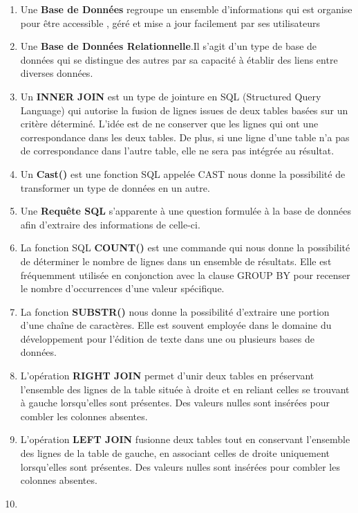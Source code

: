 \documentclass[
]{article}
\begin{document}
\begin{enumerate}
\def\labelenumi{\arabic{enumi}.}
\item
  Une \textbf{Base de Données} regroupe un ensemble d'informations qui
  est organise pour être accessible , géré et mise a jour facilement par
  ses utilisateurs
\item
  Une \textbf{Base de Données Relationnelle}.Il s'agit d'un type de base
  de données qui se distingue des autres par sa capacité à établir des
  liens entre diverses données.
\item
  Un \textbf{INNER JOIN} est un type de jointure en SQL (Structured
  Query Language) qui autorise la fusion de lignes issues de deux tables
  basées sur un critère déterminé. L'idée est de ne conserver que les
  lignes qui ont une correspondance dans les deux tables. De plus, si
  une ligne d'une table n'a pas de correspondance dans l'autre table,
  elle ne sera pas intégrée au résultat.
\item
  Un \textbf{Cast()} est une fonction SQL appelée CAST nous donne la
  possibilité de transformer un type de données en un autre.
\item
  Une \textbf{Requête SQL} s'apparente à une question formulée à la base
  de données afin d'extraire des informations de celle-ci.
\item
  La fonction SQL \textbf{COUNT()} est une commande qui nous donne la
  possibilité de déterminer le nombre de lignes dans un ensemble de
  résultats. Elle est fréquemment utilisée en conjonction avec la clause
  GROUP BY pour recenser le nombre d'occurrences d'une valeur
  spécifique.
\item
  La fonction \textbf{SUBSTR()} nous donne la possibilité d'extraire une
  portion d'une chaîne de caractères. Elle est souvent employée dans le
  domaine du développement pour l'édition de texte dans une ou plusieurs
  bases de données.
\item
  L'opération \textbf{RIGHT JOIN} permet d'unir deux tables en
  préservant l'ensemble des lignes de la table située à droite et en
  reliant celles se trouvant à gauche lorsqu'elles sont présentes. Des
  valeurs nulles sont insérées pour combler les colonnes absentes.
\item
  L'opération \textbf{LEFT JOIN} fusionne deux tables tout en conservant
  l'ensemble des lignes de la table de gauche, en associant celles de
  droite uniquement lorsqu'elles sont présentes. Des valeurs nulles sont
  insérées pour combler les colonnes absentes.
\item

\end{enumerate}
\end{document}
